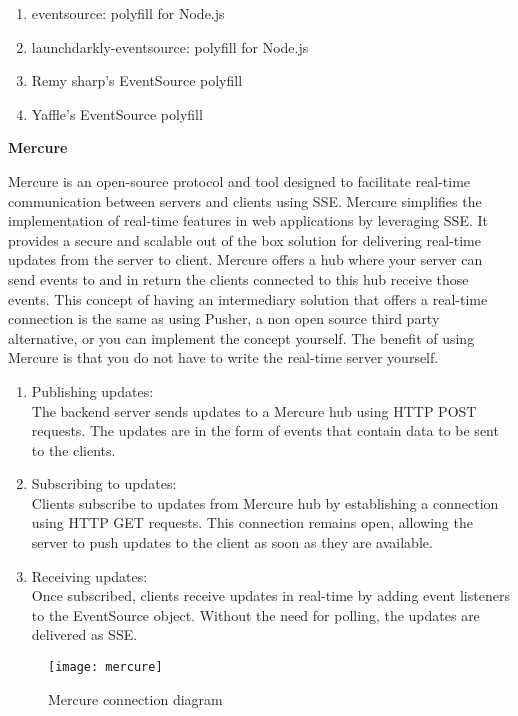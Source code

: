 \begin{enumerate}
    \item eventsource: polyfill for Node.js
    \item launchdarkly-eventsource: polyfill for Node.js
    \item Remy sharp's EventSource polyfill
    \item Yaffle's EventSource polyfill
\end{enumerate}

\textbf{Mercure}

Mercure is an open-source protocol and tool designed to facilitate real-time communication between servers and clients using SSE. Mercure simplifies the implementation of real-time features in web applications by leveraging SSE. It provides a secure and scalable out of the box solution for delivering real-time updates from the server to client. Mercure offers a hub where your server can send events to and in return the clients connected to this hub receive those events. This concept of having an intermediary solution that offers a real-time connection is the same as using Pusher, a non open source third party alternative, or you can implement the concept yourself. The benefit of using Mercure is that you do not have to write the real-time server yourself.

\begin{enumerate}
    \item Publishing updates: \\ The backend server sends updates to a Mercure hub using HTTP POST requests. The updates are in the form of events that contain data to be sent to the clients.
    \item Subscribing to updates: \\ Clients subscribe to updates from Mercure hub by establishing a connection using HTTP GET requests. This connection remains open, allowing the server to push updates to the client as soon as they are available.
    \item Receiving updates: \\ Once subscribed, clients receive updates in real-time by adding event listeners to the EventSource object. Without the need for polling, the updates are delivered as SSE.
\end{enumerate}

\begin{figure}[h]
  \caption{Mercure connection diagram}
  \texttt{[image: mercure]}
  \centering
\end{figure}

